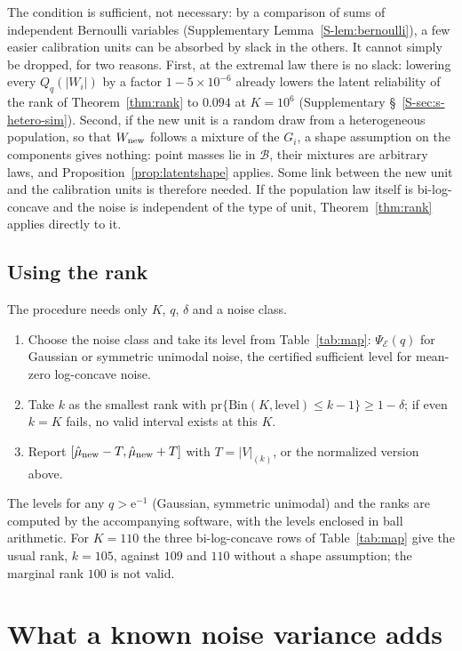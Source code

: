 \documentclass[12pt]{article}
\theoremstyle{definition}
\newcommand{\pr}{\mathrm{pr}}
\newcommand{\B}{\mathcal{B}}
\newcommand{\E}{\mathcal{E}}
\newcommand{\Bin}{\mathrm{Bin}}
\begin{document}
The condition is sufficient, not necessary: by a comparison of sums of independent Bernoulli variables (Supplementary Lemma~\ref{S-lem:bernoulli}), a few easier calibration units can be absorbed by slack in the others. It cannot simply be dropped, for two reasons. First, at the extremal law there is no slack: lowering every $Q_q(|W_i|)$ by a factor $1 - 5 \times 10^{-6}$ already lowers the latent reliability of the rank of Theorem~\ref{thm:rank} to $0.094$ at $K = 10^6$ (Supplementary \S~\ref{S-sec:s-hetero-sim}). Second, if the new unit is a random draw from a heterogeneous population, so that $W_{\rm new}$ follows a mixture of the $G_i$, a shape assumption on the components gives nothing: point masses lie in $\B$, their mixtures are arbitrary laws, and Proposition~\ref{prop:latentshape} applies. Some link between the new unit and the calibration units is therefore needed. If the population law itself is bi-log-concave and the noise is independent of the type of unit, Theorem~\ref{thm:rank} applies directly to it.

\subsection{Using the rank}

The procedure needs only $K$, $q$, $\delta$ and a noise class.
\begin{enumerate}
\item Choose the noise class and take its level from Table~\ref{tab:map}: $\Psi_{\E}(q)$ for Gaussian or symmetric unimodal noise, the certified sufficient level for mean-zero log-concave noise.
\item Take $k$ as the smallest rank with $\pr\{\Bin(K, \text{level}) \le k - 1\} \ge 1 - \delta$; if even $k = K$ fails, no valid interval exists at this $K$.
\item Report $[\hat\mu_{\rm new} - T, \hat\mu_{\rm new} + T]$ with $T = |V|_{(k)}$, or the normalized version above.
\end{enumerate}
The levels for any $q > \mathrm{e}^{-1}$ (Gaussian, symmetric unimodal) and the ranks are computed by the accompanying software, with the levels enclosed in ball arithmetic. For $K = 110$ the three bi-log-concave rows of Table~\ref{tab:map} give the usual rank, $k = 105$, against $109$ and $110$ without a shape assumption; the marginal rank $100$ is not valid.

\section{What a known noise variance adds}\label{sec:known}
\end{document}

